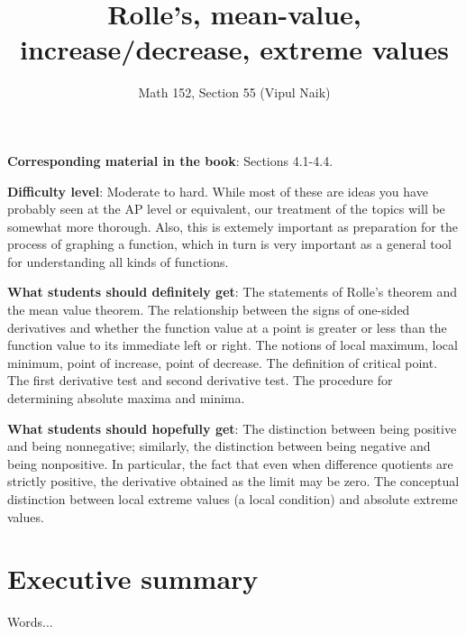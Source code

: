 \documentclass{amsart}
\title{Rolle's, mean-value, increase/decrease, extreme values}
\author{Math 152, Section 55 (Vipul Naik)}
\begin{document}
\maketitle

{\bf Corresponding material in the book}: Sections 4.1-4.4.

{\bf Difficulty level}: Moderate to hard. While most of these are
ideas you have probably seen at the AP level or equivalent, our
treatment of the topics will be somewhat more thorough. Also, this is
extemely important as preparation for the process of graphing a
function, which in turn is very important as a general tool for
understanding all kinds of functions.

{\bf What students should definitely get}: The statements of Rolle's
theorem and the mean value theorem. The relationship between the signs
of one-sided derivatives and whether the function value at a point is
greater or less than the function value to its immediate left or
right. The notions of local maximum, local minimum, point of increase,
point of decrease. The definition of critical point. The first
derivative test and second derivative test. The procedure for
determining absolute maxima and minima.

{\bf What students should hopefully get}: The distinction between
being positive and being nonnegative; similarly, the distinction
between being negative and being nonpositive. In particular, the fact
that even when difference quotients are strictly positive, the
derivative obtained as the limit may be zero. The conceptual
distinction between local extreme values (a local condition) and
absolute extreme values.

\section*{Executive summary}

Words...
\end{document}
